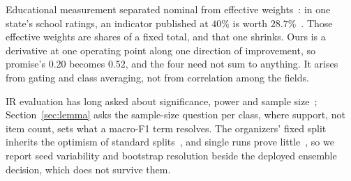  Educational measurement separated nominal from effective
weights~\cite{wang1970differential}: in one state's school ratings, an indicator published at
$40\%$ is worth $28.7\%$~\cite{shear2024nominal}. Those effective weights are shares of a fixed
total, and that one shrinks. Ours is a derivative at one operating point along one direction of
improvement, so promise's $0.20$ becomes $0.52$, and the four need not sum to anything. It
arises from gating and class averaging, not from correlation among the fields.

 IR evaluation has long asked about significance, power
and sample size~\cite{sakai2016systematic}; Section~\ref{sec:lemma} asks the sample-size question per class, where
support, not item count, sets what a macro-F1 term resolves. The organizers' fixed split inherits the optimism of standard
splits~\cite{gorman2019standard}, and single runs prove little~\cite{dodge2019showwork}, so we
report seed variability and bootstrap resolution beside the deployed ensemble decision, which does
not survive them.
